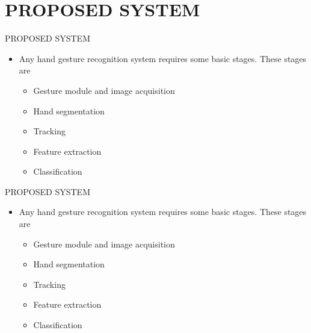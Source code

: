 \documentclass{beamer}
\begin{document}
\section{PROPOSED SYSTEM}
\begin{frame}{PROPOSED SYSTEM}
\vspace{0.5cm}
 \begin{itemize}
\item Any hand gesture recognition system requires some basic
stages. These stages are
\vspace{.5 cm}
 \begin{itemize}
\item Gesture module and image acquisition
\item Hand segmentation
\item Tracking
\item Feature extraction
\item Classification

\end{itemize}
\end{itemize}

%
\end{frame}     

\begin{frame}{PROPOSED SYSTEM}
\vspace{0.5cm}
 \begin{itemize}
\item Any hand gesture recognition system requires some basic
stages. These stages are
\vspace{.5 cm}
 \begin{itemize}
\item \alert{Gesture module and image acquisition}
\item Hand segmentation
\item Tracking
\item Feature extraction
\item Classification

\end{itemize}
\end{itemize}
\end{frame}  
\end{document}
